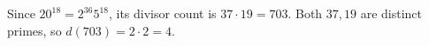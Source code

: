 Since $20^{18}=2^{36}5^{18}$, its divisor count is $37\cdot19=703$. Both $37,19$ are distinct primes, so $d(703)=2\cdot2=\boxed4$.
